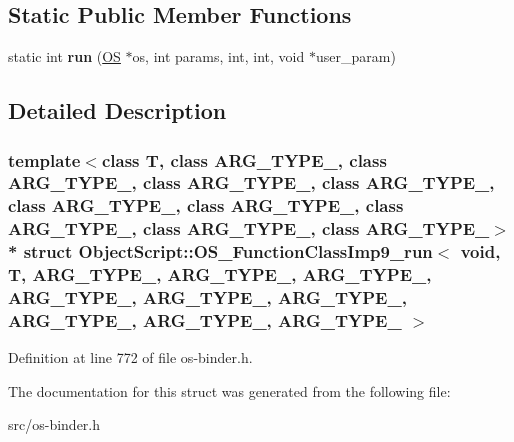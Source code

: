 \subsection*{Static Public Member Functions}
\begin{DoxyCompactItemize}
\item 
static int {\bfseries run} (\hyperlink{class_object_script_1_1_o_s}{OS} $\ast$os, int params, int, int, void $\ast$user\+\_\+param)\hypertarget{struct_object_script_1_1_o_s___function_class_imp9__run_3_01void_00_01_t_00_01_01_01_a_r_g___t_yef4b993113f2bc00e8c91b30946d2c3d_a08da2721f7f29c0812cc159502f39e36}{}\label{struct_object_script_1_1_o_s___function_class_imp9__run_3_01void_00_01_t_00_01_01_01_a_r_g___t_yef4b993113f2bc00e8c91b30946d2c3d_a08da2721f7f29c0812cc159502f39e36}

\end{DoxyCompactItemize}


\subsection{Detailed Description}
\subsubsection*{template$<$class T, class A\+R\+G\+\_\+\+T\+Y\+P\+E\+\_, class A\+R\+G\+\_\+\+T\+Y\+P\+E\+\_, class A\+R\+G\+\_\+\+T\+Y\+P\+E\+\_, class A\+R\+G\+\_\+\+T\+Y\+P\+E\+\_, class A\+R\+G\+\_\+\+T\+Y\+P\+E\+\_, class A\+R\+G\+\_\+\+T\+Y\+P\+E\+\_, class A\+R\+G\+\_\+\+T\+Y\+P\+E\+\_, class A\+R\+G\+\_\+\+T\+Y\+P\+E\+\_, class A\+R\+G\+\_\+\+T\+Y\+P\+E\+\_$>$\\*
struct Object\+Script\+::\+O\+S\+\_\+\+Function\+Class\+Imp9\+\_\+run$<$ void, T,   A\+R\+G\+\_\+\+T\+Y\+P\+E\+\_, A\+R\+G\+\_\+\+T\+Y\+P\+E\+\_, A\+R\+G\+\_\+\+T\+Y\+P\+E\+\_, A\+R\+G\+\_\+\+T\+Y\+P\+E\+\_, A\+R\+G\+\_\+\+T\+Y\+P\+E\+\_, A\+R\+G\+\_\+\+T\+Y\+P\+E\+\_, A\+R\+G\+\_\+\+T\+Y\+P\+E\+\_, A\+R\+G\+\_\+\+T\+Y\+P\+E\+\_, A\+R\+G\+\_\+\+T\+Y\+P\+E\+\_ $>$}



Definition at line 772 of file os-\/binder.\+h.



The documentation for this struct was generated from the following file\+:\begin{DoxyCompactItemize}
\item 
src/os-\/binder.\+h\end{DoxyCompactItemize}
